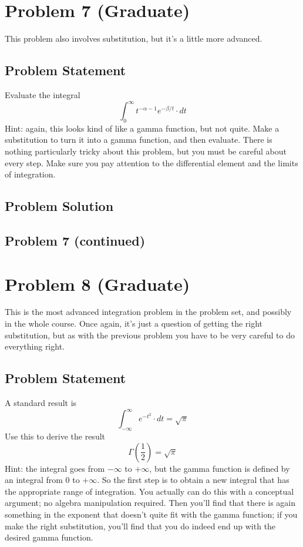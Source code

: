 \documentclass[12pt]{article}
\theoremstyle{definition}
\begin{document}
\newpage
\section*{Problem 7 (Graduate)}

This problem also involves substitution, but it's a little more advanced.

\subsection*{Problem Statement}

Evaluate the integral
$$
\int_0^\infty t^{-\alpha- 1} e^{-\beta/t} \cdot dt
$$
Hint: again, this looks kind of like a gamma function, but not quite. Make a substitution to turn it into a gamma function, and then evaluate. There is nothing particularly tricky about this problem, but you must be careful about every step. Make sure you pay attention to the differential element and the limits of integration.

\subsection*{Problem Solution}

\newpage
\subsection*{Problem 7 (continued)}



\newpage
\section*{Problem 8 (Graduate)}

This is the most advanced integration problem in the problem set, and possibly in the whole course. Once again, it's just a question of getting the right substitution, but as with the previous problem you have to be very careful to do everything right.

\subsection*{Problem Statement}

A standard result is
$$
\int_{-\infty}^\infty e^{-t^2} \cdot dt = \sqrt{\pi}
$$
Use this to derive the result
$$
\Gamma \left ( \frac{1}{2} \right ) = \sqrt{\pi}
$$
Hint: the integral goes from $-\infty$ to $+\infty$, but the gamma function is defined by an integral from $0$ to $+\infty$. So the first step is to obtain a new integral that has the appropriate range of integration. You actually can do this with a conceptual argument; no algebra manipulation required. Then you'll find that there is again something in the exponent that doesn't quite fit with the gamma function; if you make the right substitution, you'll find that you do indeed end up with the desired gamma function.
\end{document}
